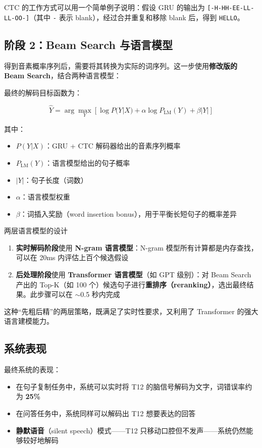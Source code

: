 CTC 的工作方式可以用一个简单例子说明：假设 GRU 的输出为 \texttt{[-H-HH-EE-LL-LL-OO-]}（其中 \texttt{-} 表示 blank），经过合并重复和移除 blank 后，得到 \texttt{HELLO}。

\subsection{阶段 2：Beam Search 与语言模型}

得到音素概率序列后，需要将其转换为实际的词序列。这一步使用\textbf{修改版的 Beam Search}，结合两种语言模型：

最终的解码目标函数为：

$$\hat{Y} = \arg\max_Y \left[ \log P(Y|X) + \alpha \log P_{\text{LM}}(Y) + \beta |Y| \right]$$

其中：
\begin{itemize}
    \item $P(Y|X)$：GRU + CTC 解码器给出的音素序列概率
    \item $P_{\text{LM}}(Y)$：语言模型给出的句子概率
    \item $|Y|$：句子长度（词数）
    \item $\alpha$：语言模型权重
    \item $\beta$：词插入奖励（word insertion bonus），用于平衡长短句子的概率差异
\end{itemize}

\begin{importantbox}{两层语言模型的设计}
\begin{enumerate}
    \item \textbf{实时解码阶段}使用 \textbf{N-gram 语言模型}：N-gram 模型所有计算都是内存查找，可以在 20ms 内评估上百个候选假设
    \item \textbf{后处理阶段}使用 \textbf{Transformer 语言模型}（如 GPT 级别）：对 Beam Search 产出的 Top-K（如 100 个）候选句子进行\textbf{重排序（reranking）}，选出最终结果。此步骤可以在 $\sim$0.5 秒内完成
\end{enumerate}

这种``先粗后精''的两层策略，既满足了实时性要求，又利用了 Transformer 的强大语言建模能力。
\end{importantbox}

\subsection{系统表现}

最终系统的表现：

\begin{itemize}
    \item 在句子复制任务中，系统可以实时将 T12 的脑信号解码为文字，词错误率约为 \textbf{25\%}
    \item 在问答任务中，系统同样可以解码出 T12 想要表达的回答
    \item \textbf{静默语音}（silent speech）模式——T12 只移动口腔但不发声——系统仍然能够较好地解码
\end{itemize}

